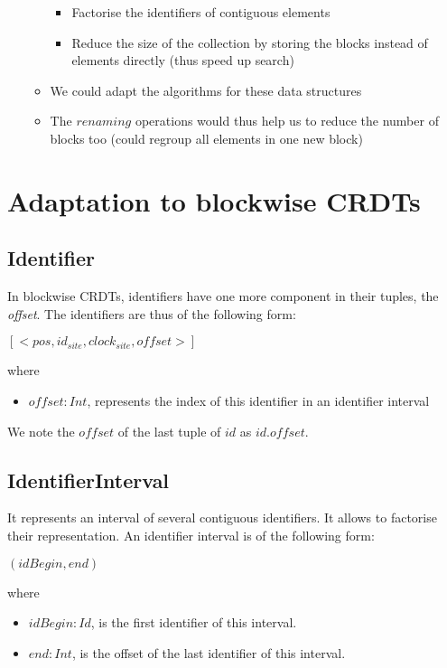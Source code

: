 \documentclass[a4paper]{article}
\begin{document}
\begin{itemize}
\begin{itemize}
    \begin{itemize}
      \item Factorise the identifiers of contiguous elements
      \item Reduce the size of the collection by storing
        the blocks instead of elements directly (thus speed up search)
    \end{itemize}
    \item We could adapt the algorithms for these data structures
    \item The $renaming$ operations would thus help us
      to reduce the number of blocks too (could regroup all elements in one new block)
  \end{itemize}
\end{itemize}

\section{Adaptation to blockwise \acp{CRDT}}

\subsection{Identifier}

In blockwise \acp{CRDT}, identifiers have one more component in their tuples, the \emph{offset}.
The identifiers are thus of the following form:

\begin{center}
  $[<pos, id_{site}, clock_{site}, offset>]$
\end{center}
where
\begin{itemize}
  \item $offset: Int$, represents the index of this identifier in an identifier interval
\end{itemize}

We note the $offset$ of the last tuple of $id$ as $id.offset$.

\subsection{IdentifierInterval}

It represents an interval of several contiguous identifiers.
It allows to factorise their representation.
An identifier interval is of the following form:

\begin{center}
  $(idBegin, end)$
\end{center}
where
\begin{itemize}
  \item $idBegin: Id$, is the first identifier of this interval.
  \item $end: Int$, is the offset of the last identifier of this interval.
\end{itemize}
\end{document}
